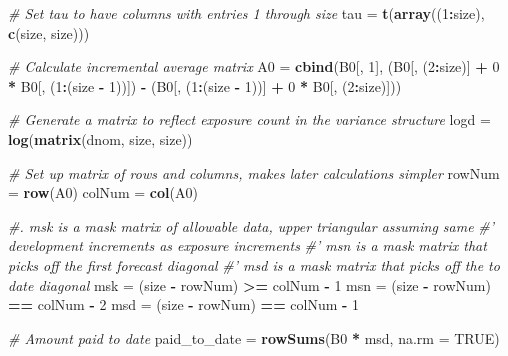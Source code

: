 \documentclass[]{article}
\newenvironment{Shaded}{\begin{snugshade}}{\end{snugshade}}
\newcommand{\CommentTok}[1]{\textcolor[rgb]{0.56,0.35,0.01}{\textit{#1}}}
\newcommand{\DataTypeTok}[1]{\textcolor[rgb]{0.13,0.29,0.53}{#1}}
\newcommand{\DecValTok}[1]{\textcolor[rgb]{0.00,0.00,0.81}{#1}}
\newcommand{\KeywordTok}[1]{\textcolor[rgb]{0.13,0.29,0.53}{\textbf{#1}}}
\newcommand{\NormalTok}[1]{#1}
\newcommand{\OperatorTok}[1]{\textcolor[rgb]{0.81,0.36,0.00}{\textbf{#1}}}
\newcommand{\OtherTok}[1]{\textcolor[rgb]{0.56,0.35,0.01}{#1}}
\newcommand{\StringTok}[1]{\textcolor[rgb]{0.31,0.60,0.02}{#1}}
\begin{document}
\begin{Shaded}
\begin{Highlighting}[]
\CommentTok{# Set tau to have columns with entries 1 through size}
\NormalTok{tau =}\StringTok{ }\KeywordTok{t}\NormalTok{(}\KeywordTok{array}\NormalTok{((}\DecValTok{1}\OperatorTok{:}\NormalTok{size), }\KeywordTok{c}\NormalTok{(size, size)))}

\CommentTok{# Calculate incremental average matrix}
\NormalTok{A0 =}\StringTok{ }\KeywordTok{cbind}\NormalTok{(B0[, }\DecValTok{1}\NormalTok{], (B0[, (}\DecValTok{2}\OperatorTok{:}\NormalTok{size)] }\OperatorTok{+}\StringTok{ }\DecValTok{0} \OperatorTok{*}\StringTok{ }\NormalTok{B0[, (}\DecValTok{1}\OperatorTok{:}\NormalTok{(size }\OperatorTok{-}\StringTok{ }\DecValTok{1}\NormalTok{))]) }\OperatorTok{-}
\StringTok{             }\NormalTok{(B0[, (}\DecValTok{1}\OperatorTok{:}\NormalTok{(size }\OperatorTok{-}\StringTok{ }\DecValTok{1}\NormalTok{))] }\OperatorTok{+}\StringTok{ }\DecValTok{0} \OperatorTok{*}\StringTok{ }\NormalTok{B0[, (}\DecValTok{2}\OperatorTok{:}\NormalTok{size)]))}

\CommentTok{# Generate a matrix to reflect exposure count in the variance structure}
\NormalTok{logd =}\StringTok{ }\KeywordTok{log}\NormalTok{(}\KeywordTok{matrix}\NormalTok{(dnom, size, size))}

\CommentTok{# Set up matrix of rows and columns, makes later calculations simpler}
\NormalTok{rowNum =}\StringTok{ }\KeywordTok{row}\NormalTok{(A0)}
\NormalTok{colNum =}\StringTok{ }\KeywordTok{col}\NormalTok{(A0)}

\CommentTok{#. msk is a mask matrix of allowable data, upper triangular assuming same}
\CommentTok{#' development increments as exposure increments}
\CommentTok{#' msn is a mask matrix that picks off the first forecast diagonal}
\CommentTok{#' msd is a mask matrix that picks off the to date diagonal}
\NormalTok{msk =}\StringTok{ }\NormalTok{(size }\OperatorTok{-}\StringTok{ }\NormalTok{rowNum) }\OperatorTok{>=}\StringTok{ }\NormalTok{colNum }\OperatorTok{-}\StringTok{ }\DecValTok{1}
\NormalTok{msn =}\StringTok{ }\NormalTok{(size }\OperatorTok{-}\StringTok{ }\NormalTok{rowNum) }\OperatorTok{==}\StringTok{ }\NormalTok{colNum }\OperatorTok{-}\StringTok{ }\DecValTok{2}
\NormalTok{msd =}\StringTok{ }\NormalTok{(size }\OperatorTok{-}\StringTok{ }\NormalTok{rowNum) }\OperatorTok{==}\StringTok{ }\NormalTok{colNum }\OperatorTok{-}\StringTok{ }\DecValTok{1}

\CommentTok{# Amount paid to date}
\NormalTok{paid_to_date =}\StringTok{ }\KeywordTok{rowSums}\NormalTok{(B0 }\OperatorTok{*}\StringTok{ }\NormalTok{msd, }\DataTypeTok{na.rm =} \OtherTok{TRUE}\NormalTok{)}
\end{Highlighting}
\end{Shaded}
\end{document}
